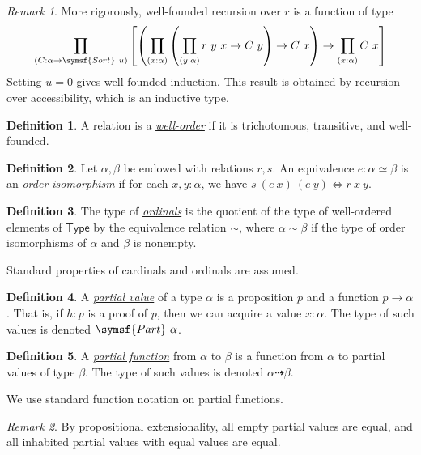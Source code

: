 \documentclass{article}
\newcommand{\mdef}[3]{\href{https://leanprover-community.github.io/mathlib4\_docs/Mathlib/#1.html\##2}{\emph{#3}}}
\theoremstyle{definition}
\newtheorem{definition}{Definition}[section]
\theoremstyle{remark}
\newtheorem*{remark}{Remark}
\begin{document}
\begin{remark}
    More rigorously, well-founded recursion over \( r \) is a function of type
    \[ \prod_{(C : \alpha \to \symsf{Sort}\ u)} \qty[ \qty(\prod_{(x : \alpha)} \qty(\prod_{(y : \alpha)} r\ y\ x \to C\ y) \to C\ x) \to \prod_{(x : \alpha)} C\ x] \]
    Setting \( u = 0 \) gives well-founded induction.
    This result is obtained by recursion over accessibility, which is an inductive type.
\end{remark}
\begin{definition}
    A relation is a \mdef{Order/RelClasses}{IsWellOrder}{well-order} if it is trichotomous, transitive, and well-founded.
\end{definition}
\begin{definition}
    Let \( \alpha, \beta \) be endowed with relations \( r, s \).
    An equivalence \( e : \alpha \simeq \beta \) is an \mdef{Order/Hom/Basic}{OrderIso}{order isomorphism} if for each \( x, y : \alpha \), we have \( s\ (e\ x)\ (e\ y) \Leftrightarrow r\ x\ y \).
\end{definition}
\begin{definition}
    The type of \mdef{SetTheory/Ordinal/Basic}{Ordinal}{ordinals} is the quotient of the type of well-ordered elements of \( \mathsf{Type} \) by the equivalence relation \( \sim \), where \( \alpha \sim \beta \) if the type of order isomorphisms of \( \alpha \) and \( \beta \) is nonempty.
\end{definition}
Standard properties of cardinals and ordinals are assumed.
\begin{definition}
    A \mdef{Data/Part}{Part}{partial value} of a type \( \alpha \) is a proposition \( p \) and a function \( p \to \alpha \).
    That is, if \( h : p \) is a proof of \( p \), then we can acquire a value \( x : \alpha \).
    The type of such values is denoted \( \symsf{Part}\ \alpha \).
\end{definition}
\begin{definition}
    A \mdef{Data/PFun}{PFun}{partial function} from \( \alpha \) to \( \beta \) is a function from \( \alpha \) to partial values of type \( \beta \).
    The type of such values is denoted \( \alpha \rightdasharrow \beta \).
\end{definition}
We use standard function notation on partial functions.
\begin{remark}
    By propositional extensionality, all empty partial values are equal, and all inhabited partial values with equal values are equal.
\end{remark}
\end{document}
